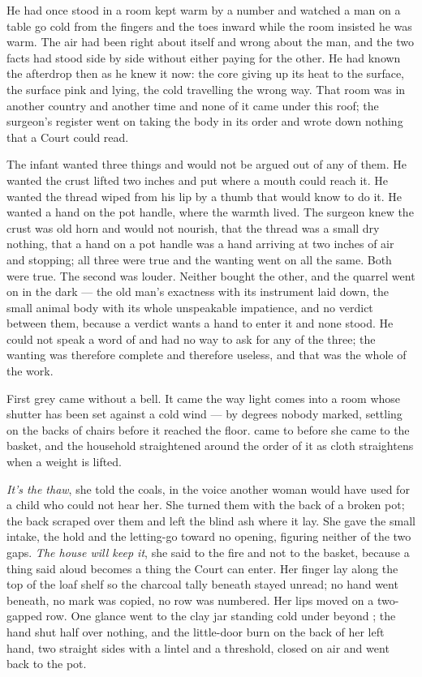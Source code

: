 He had once stood in a room kept warm by a number and watched a man on a table go cold from the fingers and the toes inward while the room insisted he was warm. The air had been right about itself and wrong about the man, and the two facts had stood side by side without either paying for the other. He had known the afterdrop then as he knew it now: the core giving up its heat to the surface, the surface pink and lying, the cold travelling the wrong way. That room was in another country and another time and none of it came under this roof; the surgeon's register went on taking the body in its order and wrote down nothing that a Court could read.

The infant wanted three things and would not be argued out of any of them. He wanted the crust lifted two inches and put where a mouth could reach it. He wanted the thread wiped from his lip by a thumb that would know to do it. He wanted a hand on the pot handle, where the warmth lived. The surgeon knew the crust was old horn and would not nourish, that the thread was a small dry nothing, that a hand on a pot handle was a hand arriving at two inches of air and stopping; all three were true and the wanting went on all the same. Both were true. The second was louder. Neither bought the other, and the quarrel went on in the dark --- the old man's exactness with its instrument laid down, the small animal body with its whole unspeakable impatience, and no verdict between them, because a verdict wants a hand to enter it and none stood. He could not speak a word of  and had no way to ask for any of the three; the wanting was therefore complete and therefore useless, and that was the whole of the work.

\scenebreak

First grey came without a bell. It came the way light comes into a room whose shutter has been set against a cold wind --- by degrees nobody marked, settling on the backs of chairs before it reached the floor.  came to  before she came to the basket, and the household straightened around the order of it as cloth straightens when a weight is lifted.

\emph{It's the thaw}, she told the coals, in the voice another woman would have used for a child who could not hear her. She turned them with the back of a broken pot; the back scraped over them and left the blind ash where it lay. She gave the small intake, the hold and the letting-go toward no opening, figuring neither of the two gaps. \emph{The house will keep it}, she said to the fire and not to the basket, because a thing said aloud becomes a thing the Court can enter. Her finger lay along the top of the loaf shelf so the charcoal tally beneath stayed unread; no hand went beneath, no mark was copied, no row was numbered. Her lips moved on a two-gapped row. One glance went to the clay jar standing cold under  beyond ; the hand shut half over nothing, and the little-door burn on the back of her left hand, two straight sides with a lintel and a threshold, closed on air and went back to the pot.


